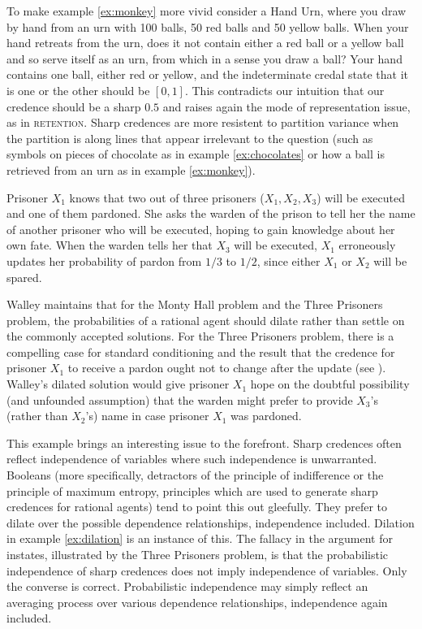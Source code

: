 \documentclass[11pt]{article}
\begin{document}
To make example \ref{ex:monkey} more vivid consider a Hand Urn, where
you draw by hand from an urn with 100 balls, 50 red balls and 50
yellow balls. When your hand retreats from the urn, does it not
contain either a red ball or a yellow ball and so serve itself as an
urn, from which in a sense you draw a ball? Your hand contains one
ball, either red or yellow, and the indeterminate credal state that it
is one or the other should be $[0,1]$. This contradicts our intuition
that our credence should be a sharp $0.5$ and raises again the mode of
representation issue, as in \textsc{retention}. Sharp credences are
more resistent to partition variance when the partition is along lines
that appear irrelevant to the question (such as symbols on pieces of
chocolate as in example \ref{ex:chocolates} or how a ball is retrieved
from an urn as in example \ref{ex:monkey}).

\begin{quotex}
  \label{ex:threepris} Prisoner $X_{1}$
  knows that two out of three prisoners ($X_{1},X_{2},X_{3}$) will be
  executed and one of them pardoned. She asks the warden of the prison
  to tell her the name of another prisoner who will be executed,
  hoping to gain knowledge about her own fate. When the warden tells
  her that $X_{3}$ will be executed, $X_{1}$ erroneously updates her
  probability of pardon from $1/3$ to $1/2$, since either $X_{1}$ or
  $X_{2}$ will be spared.
\end{quotex}

Walley maintains that for the Monty Hall problem and the Three
Prisoners problem, the probabilities of a rational agent should dilate
rather than settle on the commonly accepted solutions. For the Three
Prisoners problem, there is a compelling case for standard
conditioning and the result that the credence for prisoner $X_{1}$ to
receive a pardon ought not to change after the update (see
). Walley's dilated solution would give
prisoner $X_{1}$ hope on the doubtful possibility (and unfounded
assumption) that the warden might prefer to provide $X_{3}$'s (rather
than $X_{2}$'s) name in case prisoner $X_{1}$ was pardoned.

This example brings an interesting issue to the forefront. Sharp
credences often reflect independence of variables where such
independence is unwarranted. Booleans (more specifically, detractors
of the principle of indifference or the principle of maximum entropy,
principles which are used to generate sharp credences for rational
agents) tend to point this out gleefully. They prefer to dilate over
the possible dependence relationships, independence included. Dilation
in example \ref{ex:dilation} is an instance of this. The fallacy in
the argument for instates, illustrated by the Three Prisoners problem,
is that the probabilistic independence of sharp credences does not
imply independence of variables. Only the converse is correct.
Probabilistic independence may simply reflect an averaging process
over various dependence relationships, independence again included.
\end{document}
